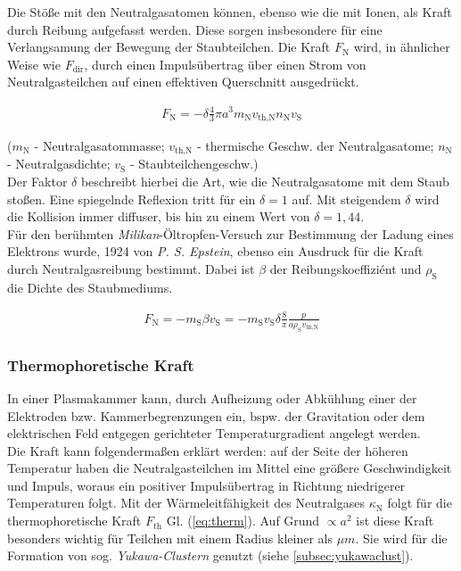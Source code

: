 \documentclass[numbers=noenddot,a4paper]{scrartcl}
\newcommand{\ix}[1]{_\text{#1}}
\newcommand{\tilt}[1]{\textit{#1}}
\begin{document}
				Die Stöße mit den Neutralgasatomen können, ebenso wie die mit Ionen, als Kraft durch Reibung aufgefasst werden. Diese sorgen insbesondere für eine Verlangsamung der Bewegung der Staubteilchen. Die Kraft $F\ix{N}$ wird, in ähnlicher Weise wie $F\ix{dir}$, durch einen Impulsübertrag über einen Strom von Neutralgasteilchen auf einen effektiven Querschnitt ausgedrückt.
				
					\begin{align}
						F\ix{N}=-\delta\frac{4}{3}\pi a^3m\ix{N}v\ix{th,N}n\ix{N}v\ix{S}
					\end{align}
					
				($m\ix{N}$ - Neutralgasatommasse; $v\ix{th,N}$ - thermische Geschw. der Neutralgasatome; $n\ix{N}$ - Neutralgasdichte; $v\ix{S}$ - Staubteilchengeschw.)\\
				Der Faktor $\delta$ beschreibt hierbei die Art, wie die Neutralgasatome mit dem Staub stoßen. Eine spiegelnde Reflexion tritt für ein $\delta=1$ auf. Mit steigendem $\delta$ wird die Kollision immer diffuser, bis hin zu einem Wert von $\delta=1,44$.\\
				Für den berühmten \tilt{Milikan}-Öltropfen-Versuch zur Bestimmung der Ladung eines Elektrons wurde, 1924 von \tilt{P. S. Epstein}, ebenso ein Ausdruck für die Kraft durch Neutralgasreibung bestimmt. Dabei ist $\beta$ der Reibungskoeffiziént und $\rho\ix{S}$ die Dichte des Staubmediums.
				
					\begin{align}
						F\ix{N}=-m\ix{S}\beta v\ix{S}=-m\ix{S}v\ix{S}\delta\frac{8}{\pi}\frac{p}{a\rho\ix{S}v\ix{th,N}}
					\end{align}
					
			\subsubsection{Thermophoretische Kraft}\label{subsub:therm}
	
				In einer Plasmakammer kann, durch Aufheizung oder Abkühlung einer der Elektroden bzw. Kammerbegrenzungen ein, bspw. der Gravitation oder dem elektrischen Feld entgegen gerichteter Temperaturgradient angelegt werden.\\
				Die Kraft kann folgendermaßen erklärt werden: auf der Seite der höheren Temperatur haben die Neutralgasteilchen im Mittel eine größere Geschwindigkeit und Impuls, woraus ein positiver Impulsübertrag in Richtung niedrigerer Temperaturen folgt.	Mit der Wärmeleitfähigkeit des Neutralgases $\kappa\ix{N}$ folgt für die thermophoretische Kraft $F\ix{th}$ Gl. (\ref{eq:therm}). Auf Grund $\propto a^2$ ist diese Kraft besonders wichtig für Teilchen mit einem Radius kleiner als $\unit{\mu m}$. Sie wird für die Formation von sog. \tilt{Yukawa-Clustern} genutzt (siehe \ref{subsec:yukawaclust}).
				
\end{document}
